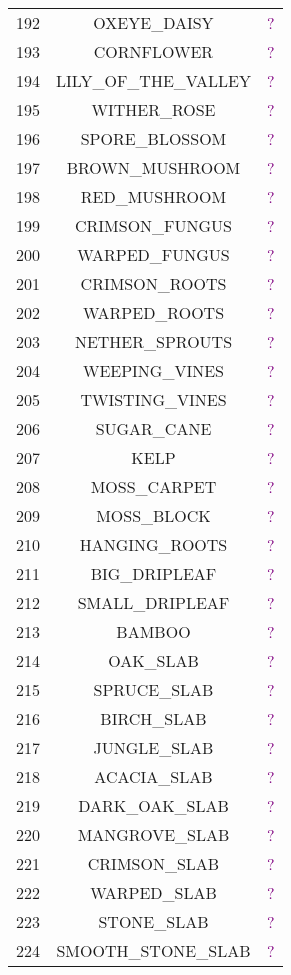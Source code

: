 \documentclass[11pt]{article}
\newcommand\myworries[1]{\textcolor{purple}{#1}}
\begin{document}
\begin{longtable}{ |c|c|c| }
	192 & OXEYE\_DAISY & \myworries{?} \\
	193 & CORNFLOWER & \myworries{?} \\
	194 & LILY\_OF\_THE\_VALLEY & \myworries{?} \\
	195 & WITHER\_ROSE & \myworries{?} \\
	196 & SPORE\_BLOSSOM & \myworries{?} \\
	197 & BROWN\_MUSHROOM & \myworries{?} \\
	198 & RED\_MUSHROOM & \myworries{?} \\
	199 & CRIMSON\_FUNGUS & \myworries{?} \\
	200 & WARPED\_FUNGUS & \myworries{?} \\
	201 & CRIMSON\_ROOTS & \myworries{?} \\
	202 & WARPED\_ROOTS & \myworries{?} \\
	203 & NETHER\_SPROUTS & \myworries{?} \\
	204 & WEEPING\_VINES & \myworries{?} \\
	205 & TWISTING\_VINES & \myworries{?} \\
	206 & SUGAR\_CANE & \myworries{?} \\
	207 & KELP & \myworries{?} \\
	208 & MOSS\_CARPET & \myworries{?} \\
	209 & MOSS\_BLOCK & \myworries{?} \\
	210 & HANGING\_ROOTS & \myworries{?} \\
	211 & BIG\_DRIPLEAF & \myworries{?} \\
	212 & SMALL\_DRIPLEAF & \myworries{?} \\
	213 & BAMBOO & \myworries{?} \\
	214 & OAK\_SLAB & \myworries{?} \\
	215 & SPRUCE\_SLAB & \myworries{?} \\
	216 & BIRCH\_SLAB & \myworries{?} \\
	217 & JUNGLE\_SLAB & \myworries{?} \\
	218 & ACACIA\_SLAB & \myworries{?} \\
	219 & DARK\_OAK\_SLAB & \myworries{?} \\
	220 & MANGROVE\_SLAB & \myworries{?} \\
	221 & CRIMSON\_SLAB & \myworries{?} \\
	222 & WARPED\_SLAB & \myworries{?} \\
	223 & STONE\_SLAB & \myworries{?} \\
	224 & SMOOTH\_STONE\_SLAB & \myworries{?} \\

\end{longtable}
\end{document}
